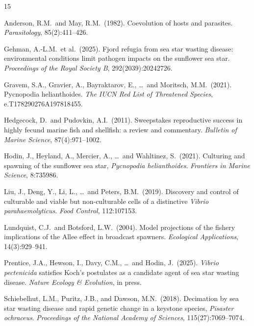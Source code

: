 \documentclass[11pt]{article}
\begin{document}
\begin{thebibliography}{15}

Anderson, R.M.\ and May, R.M.\ (1982).
\newblock Coevolution of hosts and parasites.
\newblock \textit{Parasitology}, 85(2):411--426.

Gehman, A.-L.M.\ et al.\ (2025).
\newblock Fjord refugia from sea star wasting disease: environmental conditions limit pathogen impacts on the sunflower sea star.
\newblock \textit{Proceedings of the Royal Society B}, 292(2039):20242726.

Gravem, S.A., Gravier, A., Bayraktarov, E., \ldots\ and Moritsch, M.M.\ (2021).
\newblock Pycnopodia helianthoides.
\newblock \textit{The IUCN Red List of Threatened Species}, e.T178290276A197818455.

Hedgecock, D.\ and Pudovkin, A.I.\ (2011).
\newblock Sweepstakes reproductive success in highly fecund marine fish and shellfish: a review and commentary.
\newblock \textit{Bulletin of Marine Science}, 87(4):971--1002.

Hodin, J., Heyland, A., Mercier, A., \ldots\ and Wahltinez, S.\ (2021).
\newblock Culturing and spawning of the sunflower sea star, \textit{Pycnopodia helianthoides}.
\newblock \textit{Frontiers in Marine Science}, 8:735986.

Liu, J., Deng, Y., Li, L., \ldots\ and Peters, B.M.\ (2019).
\newblock Discovery and control of culturable and viable but non-culturable cells of a distinctive \textit{Vibrio parahaemolyticus}.
\newblock \textit{Food Control}, 112:107153.

Lundquist, C.J.\ and Botsford, L.W.\ (2004).
\newblock Model projections of the fishery implications of the Allee effect in broadcast spawners.
\newblock \textit{Ecological Applications}, 14(3):929--941.

Prentice, J.A., Hewson, I., Davy, C.M., \ldots\ and Hodin, J.\ (2025).
\newblock \textit{Vibrio pectenicida} satisfies Koch's postulates as a candidate agent of sea star wasting disease.
\newblock \textit{Nature Ecology \& Evolution}, in press.

Schiebelhut, L.M., Puritz, J.B., and Dawson, M.N.\ (2018).
\newblock Decimation by sea star wasting disease and rapid genetic change in a keystone species, \textit{Pisaster ochraceus}.
\newblock \textit{Proceedings of the National Academy of Sciences}, 115(27):7069--7074.


\end{thebibliography}
\end{document}
